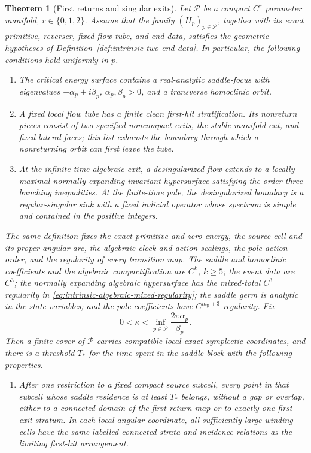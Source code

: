 \documentclass[11pt]{amsart}
\numberwithin{equation}{section}
\newtheorem{theorem}{Theorem}[section]
\theoremstyle{definition}
\theoremstyle{remark}
\begin{document}
\begin{theorem}[First returns and singular exits]
\label{thm:main-result}
Let $\mathcal P$ be a compact $C^r$ parameter manifold,
$r\in\{0,1,2\}$.  Assume that the family $(H_p)_{p\in\mathcal P}$,
together with its exact primitive, reverser, fixed flow tube, and end data,
satisfies the geometric hypotheses of
Definition~\ref{def:intrinsic-two-end-data}.  In particular, the following
conditions hold uniformly in $p$.
\begin{enumerate}
\renewcommand{\labelenumi}{\textup{(\roman{enumi})}}
\item The critical energy surface contains a real-analytic saddle-focus
with eigenvalues $\pm\alpha_p\pm i\beta_p$, $\alpha_p,\beta_p>0$, and a
transverse homoclinic orbit.
\item A fixed local flow tube has a finite clean first-hit stratification.
Its nonreturn pieces consist of two specified noncompact exits, the
stable-manifold cut, and fixed lateral faces; this list exhausts the
boundary through which a nonreturning orbit can first leave the tube.
\item At the infinite-time algebraic exit, a desingularized flow extends
to a locally maximal normally expanding invariant hypersurface satisfying
the order-three bunching inequalities.  At the finite-time pole, the
desingularized boundary is a regular-singular sink with a fixed indicial
operator whose spectrum is simple and contained in the positive integers.
\end{enumerate}
The same definition fixes the exact primitive and zero energy, the source
cell and its proper angular arc, the algebraic clock and action scalings,
the pole action order, and the regularity of every transition map.  The
saddle and homoclinic coefficients and the algebraic compactification are
$C^k$, $k\ge5$; the event data are $C^3$; the normally expanding
algebraic hypersurface has the mixed-total $C^3$ regularity in
\eqref{eq:intrinsic-algebraic-mixed-regularity}; the saddle germ is
analytic in the state variables; and the pole coefficients have
$C^{m_{\mathrm p}+3}$ regularity.
Fix
\[
 0<\kappa<
 \inf_{p\in\mathcal P}\frac{2\pi\alpha_p}{\beta_p}.
\]
Then a finite cover of $\mathcal P$ carries compatible local exact
symplectic coordinates, and there is a threshold $T_*$ for the time spent
in the saddle block with the following properties.

\begin{enumerate}
\renewcommand{\labelenumi}{\textup{(\alph{enumi})}}
\item After one restriction to a fixed compact source subcell, every point
in that subcell whose saddle residence is at least $T_*$ belongs, without a
gap or overlap, either to a connected
domain of the first-return map or to exactly one first-exit stratum.  In each
local angular coordinate, all sufficiently large winding cells have the
same labelled connected strata and incidence relations as the limiting
first-hit arrangement.


\end{enumerate}
\end{theorem}
\end{document}
